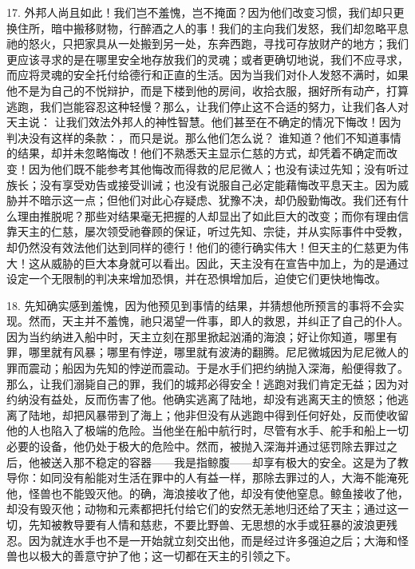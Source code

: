 17. 外邦人尚且如此！我们岂不羞愧，岂不掩面？因为他们改变习惯，我们却只更换住所，暗中搬移财物，行醉酒之人的事！我们的主向我们发怒，我们却忽略平息祂的怒火，只把家具从一处搬到另一处，东奔西跑，寻找可存放财产的地方；我们更应该寻求的是在哪里安全地存放我们的灵魂；或者更确切地说，我们不应寻求，而应将灵魂的安全托付给德行和正直的生活。因为当我们对仆人发怒不满时，如果他不是为自己的不悦辩护，而是下楼到他的房间，收拾衣服，捆好所有动产，打算逃跑，我们岂能容忍这种轻慢？那么，让我们停止这不合适的努力，让我们各人对天主说： 让我们效法外邦人的神性智慧。他们甚至在不确定的情况下悔改！因为判决没有这样的条款：，而只是说。那么他们怎么说？  谁知道？他们不知道事情的结果，却并未忽略悔改！他们不熟悉天主显示仁慈的方式，却凭着不确定而改变！因为他们既不能参考其他悔改而得救的尼尼微人；也没有读过先知；没有听过族长；没有享受劝告或接受训诫；也没有说服自己必定能藉悔改平息天主。因为威胁并不暗示这一点；但他们对此心存疑虑、犹豫不决，却仍殷勤悔改。我们还有什么理由推脱呢？那些对结果毫无把握的人却显出了如此巨大的改变；而你有理由信靠天主的仁慈，屡次领受祂眷顾的保证，听过先知、宗徒，并从实际事件中受教，却仍然没有效法他们达到同样的德行！他们的德行确实伟大！但天主的仁慈更为伟大！这从威胁的巨大本身就可以看出。因此，天主没有在宣告中加上，为的是通过设定一个无限制的判决来增加恐惧，并在恐惧增加后，迫使它们更快地悔改。\par

18. 先知确实感到羞愧，因为他预见到事情的结果，并猜想他所预言的事将不会实现。然而，天主并不羞愧，祂只渴望一件事，即人的救恩，并纠正了自己的仆人。因为当约纳进入船中时，天主立刻在那里掀起汹涌的海浪；好让你知道，哪里有罪，哪里就有风暴；哪里有悖逆，哪里就有波涛的翻腾。尼尼微城因为尼尼微人的罪而震动；船因为先知的悖逆而震动。于是水手们把约纳抛入深海，船便得救了。那么，让我们溺毙自己的罪，我们的城邦必得安全！逃跑对我们肯定无益；因为对约纳没有益处，反而伤害了他。他确实逃离了陆地，却没有逃离天主的愤怒；他逃离了陆地，却把风暴带到了海上；他非但没有从逃跑中得到任何好处，反而使收留他的人也陷入了极端的危险。当他坐在船中航行时，尽管有水手、舵手和船上一切必要的设备，他仍处于极大的危险中。然而，被抛入深海并通过惩罚除去罪过之后，他被送入那不稳定的容器——我是指鲸腹——却享有极大的安全。这是为了教导你：如同没有船能对生活在罪中的人有益一样，那除去罪过的人，大海不能淹死他，怪兽也不能毁灭他。的确，海浪接收了他，却没有使他窒息。鲸鱼接收了他，却没有毁灭他；动物和元素都把托付给它们的安然无恙地归还给了天主；通过这一切，先知被教导要有人情和慈悲，不要比野兽、无思想的水手或狂暴的波浪更残忍。因为就连水手也不是一开始就立刻交出他，而是经过许多强迫之后；大海和怪兽也以极大的善意守护了他；这一切都在天主的引领之下。\par

